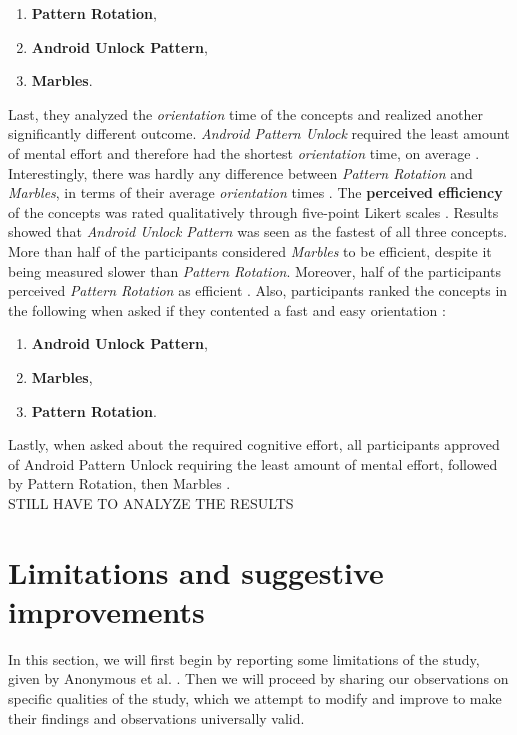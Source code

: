 \begin{enumerate}
    \item \textbf{Pattern Rotation},
    \item \textbf{Android Unlock Pattern},
    \item \textbf{Marbles}.
\end{enumerate}

Last, they analyzed the \textit{orientation} time of the concepts and realized another significantly different outcome. \textit{Android Pattern Unlock} required the least amount of mental effort and therefore had the shortest \textit{orientation} time, on average \cite{anonymous}. Interestingly, there was hardly any difference between \textit{Pattern Rotation} and \textit{Marbles}, in terms of their average \textit{orientation} times \cite{anonymous}. The \textbf{perceived efficiency} of the concepts was rated qualitatively through five-point Likert scales \cite{anonymous}. Results showed that \textit{Android Unlock Pattern} was seen as the fastest of all three concepts. More than half of the participants considered \textit{Marbles} to be efficient, despite it being measured slower than \textit{Pattern Rotation}. Moreover, half of the participants perceived \textit{Pattern Rotation} as efficient \cite{anonymous}. Also, participants ranked the concepts in the following when asked if they contented a fast and easy orientation \cite{anonymous}: 

\begin{enumerate}
     \item \textbf{Android Unlock Pattern},
    \item \textbf{Marbles},
    \item \textbf{Pattern Rotation}.
\end{enumerate}

Lastly, when asked about the required cognitive effort, all participants approved of Android Pattern Unlock requiring the least amount of mental effort, followed by Pattern Rotation, then Marbles \cite{anonymous}. \\

STILL HAVE TO ANALYZE THE RESULTS

\section{Limitations and suggestive improvements}

In this section, we will first begin by reporting some limitations of the study, given by Anonymous et al. \cite{anonymous}. Then we will proceed by sharing our observations on specific qualities of the study, which we attempt to modify and improve to make their findings and observations universally valid.  

